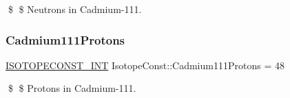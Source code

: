 \$ \$ Neutrons in Cadmium-\/111. \mbox{\label{group___isotope_const-_cadmium-_cd111_ga7807b7806558e72a1439ba369aaddc2d}} 
\subsubsection{\texorpdfstring{Cadmium111\+Protons}{Cadmium111Protons}}
{\footnotesize\ttfamily \mbox{\hyperlink{group___isotope_const-_macros_ga5f18360b3e99483a35c32d789e62621c}{I\+S\+O\+T\+O\+P\+E\+C\+O\+N\+S\+T\+\_\+\+I\+NT}} Isotope\+Const\+::\+Cadmium111\+Protons = 48}

\$ \$ Protons in Cadmium-\/111. 
